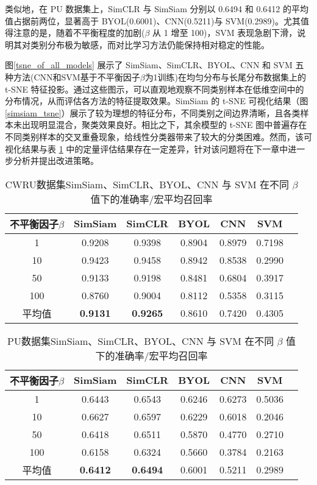 \documentclass[master]{thesis-uestc}
\begin{document}
类似地，在 PU 数据集上，SimCLR 与 SimSiam 分别以 0.6494 和 0.6412 的平均值占据前两位，显著高于 BYOL(0.6001)、CNN(0.5211)与 SVM(0.2989)。尤其值得注意的是，随着不平衡程度的加剧($\beta$ 从 1 增至 100)，SVM 表现急剧下滑，说明其对类别分布极为敏感，而对比学习方法仍能保持相对稳定的性能。

图\ref{tsne_of_all_models} 展示了 SimSiam、SimCLR、BYOL、CNN 和 SVM 五种方法(CNN和SVM基于不平衡因子$\beta$为1训练)在均匀分布与长尾分布数据集上的 t-SNE 特征投影。通过这些图示，可以直观地观察不同类别样本在低维空间中的分布情况，从而评估各方法的特征提取效果。SimSiam 的 t-SNE 可视化结果（图 \ref{simsiam_tsne}）展示了较为理想的特征分布，不同类别之间边界清晰，且各类样本未出现明显混合，聚类效果良好。相比之下，其余模型的 t-SNE 图中普遍存在不同类别样本的交叉重叠现象，给线性分类器带来了较大的分类困难。然而，该可视化结果与表 \ref{simsiam_simclr_byol_cnn_svm_results} 中的定量评估结果存在一定差异，针对该问题将在下一章中进一步分析并提出改进策略。

\begin{table}[!h]
    \caption{CWRU数据集SimSiam、SimCLR、BYOL、CNN 与 SVM 在不同 $\beta$ 值下的准确率/宏平均召回率}
    \centering
    \begin{tabular}{ccccccc}
    \toprule
    不平衡因子$\beta$  & SimSiam & SimCLR & BYOL & CNN & SVM \\
    \midrule
    1   & 0.9208  & 0.9398 & 0.8904 & 0.8979 & 0.7198 \\
    10  & 0.9423  & 0.9458 & 0.8942 & 0.8538 & 0.2990 \\
    50  & 0.9133  & 0.9198 & 0.8481 & 0.6804 & 0.3917 \\
    100 & 0.8760  & 0.9004 & 0.8112 & 0.5358 & 0.3115 \\
    \midrule
    平均值 & \textbf{0.9131} & \textbf{0.9265} & 0.8610 & 0.7420 & 0.4305 \\
    \bottomrule
    \end{tabular}
    \label{simsiam_simclr_byol_cnn_svm_results}
\end{table}

\begin{table}[!h]
    \caption{PU数据集SimSiam、SimCLR、BYOL、CNN 与 SVM 在不同 $\beta$ 值下的准确率/宏平均召回率}
    \centering
    \begin{tabular}{ccccccc}
    \toprule
    不平衡因子$\beta$  & SimSiam & SimCLR & BYOL & CNN & SVM \\
    \midrule
    1   & 0.6443  & 0.6543 & 0.6246 & 0.6273 & 0.5036 \\
    10  & 0.6627  & 0.6597 & 0.6229 & 0.6018 & 0.2046 \\
    50  & 0.6418  & 0.6511 & 0.5870 & 0.4770 & 0.2710 \\
    100 & 0.6158  & 0.6324 & 0.5660 & 0.3784 & 0.2163 \\
    \midrule
    平均值 & \textbf{0.6412} & \textbf{0.6494} & 0.6001 & 0.5211 & 0.2989 \\
    \bottomrule
    \end{tabular}
    \label{pu_simsiam_simclr_byol_cnn_svm_results}
\end{table}
\end{document}
